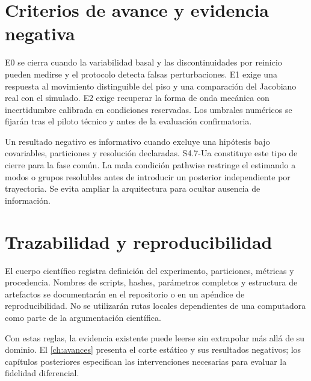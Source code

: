 \section{Criterios de avance y evidencia negativa}

E0 se cierra cuando la variabilidad basal y las discontinuidades por reinicio pueden medirse y el protocolo detecta falsas perturbaciones. E1 exige una respuesta al movimiento distinguible del piso y una comparación del Jacobiano real con el simulado. E2 exige recuperar la forma de onda mecánica con incertidumbre calibrada en condiciones reservadas. Los umbrales numéricos se fijarán tras el piloto técnico y antes de la evaluación confirmatoria.

Un resultado negativo es informativo cuando excluye una hipótesis bajo covariables, particiones y resolución declaradas. S4.7-Ua constituye este tipo de cierre para la fase común. La mala condición pathwise restringe el estimando a modos o grupos resolubles antes de introducir un posterior independiente por trayectoria. Se evita ampliar la arquitectura para ocultar ausencia de información.

\section{Trazabilidad y reproducibilidad}

El cuerpo científico registra definición del experimento, particiones, métricas y procedencia. Nombres de scripts, hashes, parámetros completos y estructura de artefactos se documentarán en el repositorio o en un apéndice de reproducibilidad. No se utilizarán rutas locales dependientes de una computadora como parte de la argumentación científica.

Con estas reglas, la evidencia existente puede leerse sin extrapolar más allá de su
dominio. El \cref{ch:avances} presenta el corte estático y sus resultados negativos;
los capítulos posteriores especifican las intervenciones necesarias para evaluar la
fidelidad diferencial.
